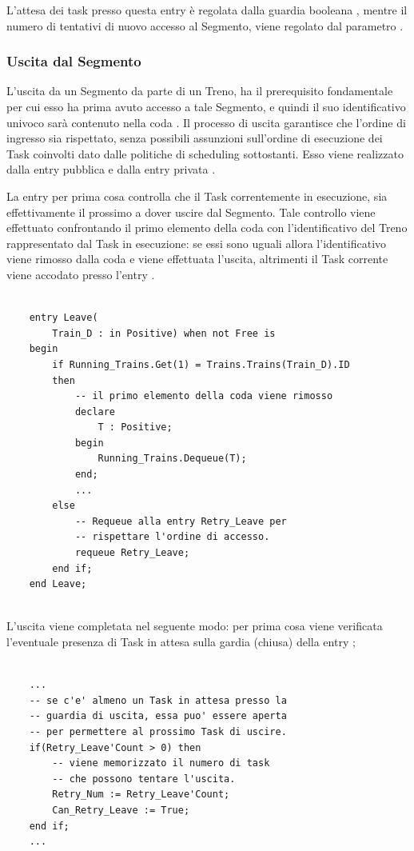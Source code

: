	L'attesa dei task presso questa entry è regolata dalla guardia booleana , mentre il numero di tentativi di nuovo accesso al Segmento, viene regolato dal parametro .
	
	\subsubsection{Uscita dal Segmento}
	
	L'uscita da un Segmento da parte di un Treno, ha il prerequisito fondamentale per cui esso ha prima avuto accesso a tale Segmento, e quindi il suo identificativo univoco sarà contenuto nella coda .
	Il processo di uscita garantisce che l'ordine di ingresso sia rispettato, senza possibili assunzioni sull'ordine di esecuzione dei Task coinvolti dato dalle politiche di scheduling sottostanti.
	Esso viene realizzato dalla entry pubblica  e dalla entry privata .
	
	La entry  per prima cosa controlla che il Task correntemente in esecuzione, sia effettivamente il prossimo a dover uscire dal Segmento. Tale controllo viene effettuato confrontando il primo elemento della coda  con l'identificativo del Treno rappresentato dal Task in esecuzione: se essi sono uguali allora l'identificativo viene rimosso dalla coda e viene effettuata l'uscita, altrimenti il Task corrente viene accodato presso l'entry .
	
\begin{lstlisting}
	
	entry Leave(
		Train_D : in Positive) when not Free is
	begin
		if Running_Trains.Get(1) = Trains.Trains(Train_D).ID 
		then
			-- il primo elemento della coda viene rimosso
			declare
				T : Positive;
			begin
				Running_Trains.Dequeue(T);
			end;
			...
		else
			-- Requeue alla entry Retry_Leave per
			-- rispettare l'ordine di accesso.
			requeue Retry_Leave;
		end if;
	end Leave;
		
\end{lstlisting}
	 
	L'uscita viene completata nel seguente modo: per prima cosa viene verificata l'eventuale presenza di Task in attesa sulla gardia (chiusa) della entry ;
	
\begin{lstlisting}
	
	...
	-- se c'e' almeno un Task in attesa presso la
	-- guardia di uscita, essa puo' essere aperta
	-- per permettere al prossimo Task di uscire.
	if(Retry_Leave'Count > 0) then
		-- viene memorizzato il numero di task
		-- che possono tentare l'uscita.
		Retry_Num := Retry_Leave'Count;
		Can_Retry_Leave := True;
	end if;
	...
	
\end{lstlisting}
	
